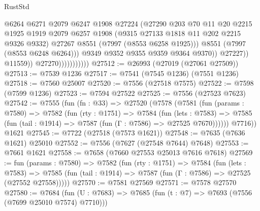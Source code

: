 \begin{lexlean}{RustStd}
\begin{coremodule}
{\begin{coremodule}
{{{{{{{{{{{{{{{{{{{{{{{{{{{{{{{{{{{{{{{{{{{                                        @6264
                                        @6271
                                        @2079
                                        @6247
                                        @1908
                                        @27224
                                        (@27290
                                          @203
                                          @70
                                          @11
                                          @20
                                          @2215
                                          @1925
                                          @1919
                                          @2079
                                          @6257
                                          @1908
                                          (@9315 @27133 @1818 @11 @202 @2215 @9326 @9332)
                                          @27267
                                          @8551
                                          (@7997 (@8553 @6258 @1925)))
                                        @8551
                                        (@7997 (@8553 @6248 @6264)))
                                      @9349
                                      @9352
                                      @9355
                                      @9359
                                      @9364
                                      @9370))
                                  @27227))
                              @11559))
                          @27270)))))))))))
@27512 := @26993 (@27019 (@27061 @27509))
@27513 := @7539 @1236
@27517 := @7541 (@7545 @1236) (@7551 @1236)
@27518 := @7560 @25007
@27520 := @7556 (@27518 @7575)
@27522 := @7598 (@7599 @1236)
@27523 := @7594 @27522
@27525 := @7556 (@27523 @7623)
@27542 := @7555
    (fun (fn : @33) =>
    @27520
      (@7578
        (@7581
          (fun (params : @7580) =>
          @7582
            (fun (rty : @1751) =>
            @7584
              (fun (lets : @7583) =>
              @7585 (fun (tail : @1914) => @7587 (fun (Γ : @7586) => @27525 @7670))))))
        @7716))
    @1621
@27545 := @7722 (@27518 (@7573 @1621))
@27548 := @7635 (@7636 @1621) @25010
@27552 := @7556 (@7627 (@27548 @7644) @7648)
@27553 := @7661 @1621
@27558 := @7658 (@7660 @27553 @25013 @7616 @7618)
@27569 := fun (params : @7580) =>
  @7582
    (fun (rty : @1751) =>
    @7584
      (fun (lets : @7583) =>
      @7585 (fun (tail : @1914) => @7587 (fun (Γ : @7586) => @27525 (@27552 @27558)))))
@27570 := @7581 @27569
@27571 := @7578 @27570
@27580 := @7684
    (fun (U : @7683) => @7685 (fun (t : @7) => @7693 (@7556 (@7699 @25010 @7574) @7710)))
}}}}}}}}}}}}}}}}}}}}}}}}}}}}}}}}}}}}}}}}}}}
\end{coremodule}}
\end{coremodule}
\end{lexlean}
